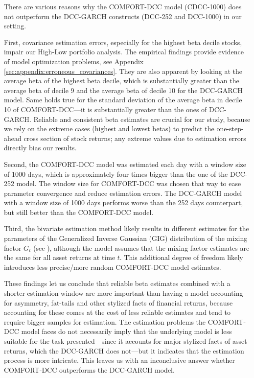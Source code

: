 \documentclass[11pt,a4paper]{article}
\begin{document}
There are various reasons why the COMFORT-DCC model (CDCC-1000) does not outperform the DCC-GARCH constructs (DCC-252 and DCC-1000) in our setting.

First, covariance estimation errors, especially for the highest beta decile stocks, impair our High-Low portfolio analysis. The empirical findings provide evidence of model optimization problems, see Appendix \ref{sec:appendix:erroneous_covariances}. They are also apparent by looking at the average beta of the highest beta decile, which is substantially greater than the average beta of decile 9 and the average beta of decile 10 for the DCC-GARCH model. Same holds true for the standard deviation of the average beta in decile 10 of COMFORT-DCC---it is substantially greater than the ones of DCC-GARCH. Reliable and consistent beta estimates are crucial for our study, because we rely on the extreme cases (highest and lowest betas) to predict the one-step-ahead cross section of stock returns; any extreme values due to estimation errors directly bias our results. 

Second, the COMFORT-DCC model was estimated each day with a window size of 1000 days, which is approximately four times bigger than the one of the DCC-252 model. The window size for COMFORT-DCC was chosen that way to ease parameter convergence and reduce estimation errors. The DCC-GARCH model with a window size of 1000 days performs worse than the 252 days counterpart, but still better than the COMFORT-DCC model.

Third, the bivariate estimation method likely results in different estimates for the parameters of the Generalized Inverse Gaussian (GIG) distribution of the mixing factor $G_t$ (see ), although the model assumes that the mixing factor estimates are the same for all asset returns at time $t$. This additional degree of freedom likely introduces less precise/more random COMFORT-DCC model estimates.

These findings let us conclude that reliable beta estimates combined with a shorter estimation window are more important than having a model accounting for asymmetry, fat-tails and other stylized facts of financial returns, because accounting for these comes at the cost of less reliable estimates and tend to require bigger samples for estimation. The estimation problems the COMFORT-DCC model faces do not necessarily imply that the underlying model is less suitable for the task presented---since it accounts for major stylized facts of asset returns, which the DCC-GARCH does not---but it indicates that the estimation process is more intricate. This leaves us with an inconclusive answer whether COMFORT-DCC outperforms the DCC-GARCH model.
\end{document}
